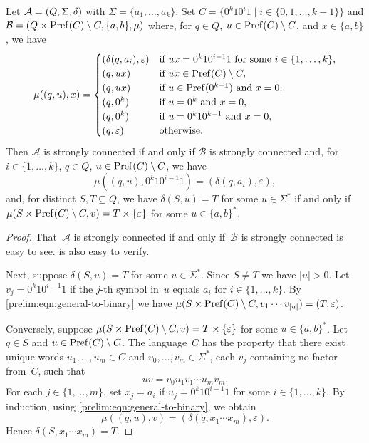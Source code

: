 \begin{lemma} \label{prelim:lem:alphabet-reduction}
	Let $\mathcal A = (Q, \Sigma, \delta)$ with $\Sigma = \{a_1, \ldots, a_k\}$.
	Set $C = \{ 0^{k} 10^i1 \mid i \in \{0,1,\ldots,k-1\}\}$
	and $\mathcal B = (Q \times \operatorname{Pref}(C)\setminus C, \{a,b\}, \mu)$
	where, for $q \in Q$, $u \in \operatorname{Pref}(C)\setminus C$, and $x \in \{a,b\}$,
	we have
	\[
	\mu((q,u), x) =
	\begin{cases}
		(\delta(q, a_i), \varepsilon) & \text{if } ux = 0^k10^{i-1}1 \text{ for some } i \in \{1,\ldots,k\}, \\
		(q, ux)  & \text{if } ux \in \operatorname{Pref}(C) \setminus C, \\
		(q, ux)  & \text{if } u \in \operatorname{Pref}(0^{k-1}) \text{ and } x = 0, \\
		(q, 0^k) & \text{if } u = 0^k \text{ and } x = 0, \\
		(q, 0^k) & \text{if } u = 0^k10^{k-1} \text{ and } x = 0, \\
		(q, \varepsilon) & \text{otherwise.}
	\end{cases}
	\]
	Then $\mathcal A$ is strongly connected if and only if $\mathcal B$ 
	is strongly connected and, for $i \in \{1,\ldots,k\}$, $q \in Q$, $u \in \operatorname{Pref}(C)\setminus C$,
	we have
	\begin{equation}\label{prelim:eqn:general-to-binary}
	\mu((q, u), 0^k10^{i-1}1) = (\delta(q, a_i), \varepsilon),
	\end{equation}
	and, for distinct $S, T \subseteq Q$,
	we have $\delta(S, u) = T$ for some $u \in \Sigma^*$
	if and only if $\mu(S \times \operatorname{Pref}(C)\setminus C, v) = T \times \{\varepsilon\}$ 
	for some $u \in \{a,b\}^*$.
\end{lemma}
\begin{proof}
	That~$\mathcal A$ is strongly connected if and only if~$\mathcal B$
	is strongly connected is easy to see.
	 is also easy to verify.
		
 Next, suppose $\delta(S, u) = T$ for some $u \in \Sigma^*$. Since $S \ne T$ we have $|u| > 0$.
 Let $v_j = 0^k 1 0^{i-1} 1$ if the $j$-th symbol in~$u$ equals $a_i$
 for $i \in \{1,\ldots,k\}$.
 By \cref{prelim:eqn:general-to-binary} 
 we have $\mu(S \times \operatorname{Pref}(C)\setminus C, v_1 \cdots v_{|u|}) = (T, \varepsilon)$.
 
 Conversely, suppose $\mu(S \times \operatorname{Pref}(C)\setminus C, v) = T \times \{\varepsilon\}$ 
 for some $u \in \{a,b\}^*$.
 Let $q \in S$ and $u \in \operatorname{Pref}(C)\setminus C$.
 The language~$C$ has the property that there exist unique words
 $u_1, \ldots, u_m \in C$ and $v_0, \ldots, v_m \in \Sigma^*$,
 each $v_j$ containing no factor from~$C$, such that
 \[
 uv = v_0 u_1 v_1 \cdots u_m v_m.
 \]
 For each $j \in \{1,\ldots,m\}$, set $x_j=a_i$ if
 $u_j = 0^k10^{i-1}1$ for some $i \in \{1,\ldots,k\}$.
 By induction, using \cref{prelim:eqn:general-to-binary}, we obtain
 \[
 \mu((q,u),v)
 =
 (\delta(q,x_1\cdots x_m),\varepsilon).
 \]
 Hence $\delta(S,x_1\cdots x_m)=T$. 
\end{proof}

